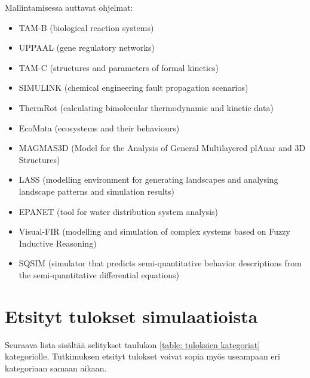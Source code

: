 \documentclass[utf8]{gradu3}
\begin{document}
Mallintamisessa auttavat ohjelmat:
\begin{itemize}
    \item TAM-B (biological reaction systems)
    \item UPPAAL (gene regulatory networks)
    \item TAM-C (structures and parameters of formal kinetics)
    \item SIMULINK (chemical engineering fault propagation scenarios)
    \item ThermRot (calculating bimolecular thermodynamic and kinetic data)
    \item EcoMata (ecosystems and their behaviours)
    \item MAGMAS3D (Model for the Analysis of General Multilayered plAnar and 3D Structures)
    \item LASS (modelling environment for generating landscapes and analysing landscape patterns and simulation results)
    \item EPANET (tool for water distribution system analysis)
    \item Visual-FIR (modelling and simulation of complex systems based on Fuzzy Inductive Reasoning)
    \item SQSIM (simulator that predicts semi-quantitative behavior descriptions from the  semi-quantitative differential equations)
\end{itemize}


\section{Etsityt tulokset simulaatioista} \label{simulaatiotulokset}
Seuraava lista sisältää selitykset taulukon \ref{table: tuloksien kategoriat} kategoriolle.
Tutkimuksen etsityt tulokset voivat sopia myös useampaan eri kategoriaan samaan aikaan. 
\end{document}
